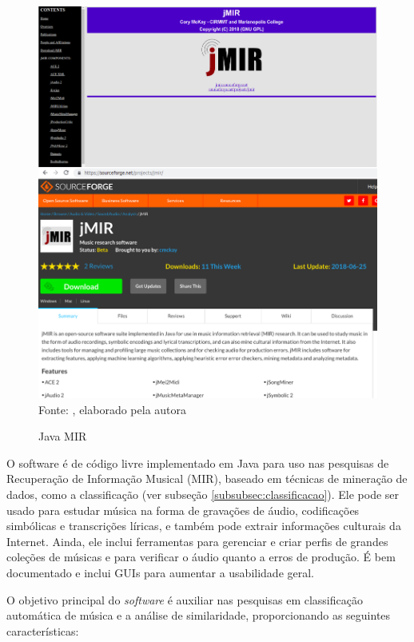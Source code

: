 
\begin{figure}[!htb]
   \centering
   \caption{Java MIR}\label{fig:jmir} 
   \includegraphics[scale=0.25]{figuras/jmir.png}
   \\Fonte: \cite{jmir}, elaborado pela autora
\end{figure}

O software é de código livre implementado em Java para uso nas pesquisas de Recuperação de Informação Musical (MIR), baseado em técnicas de mineração de dados, como a classificação (ver subseção \ref{subsubsec:classificacao}). Ele pode ser usado para estudar música na forma de gravações de áudio, codificações simbólicas e transcrições líricas, e também pode extrair informações culturais da Internet. Ainda, ele inclui ferramentas para gerenciar e criar perfis de grandes coleções de músicas e para verificar o áudio quanto a erros de produção. É bem documentado e inclui GUIs para aumentar a usabilidade geral.

O objetivo principal do \textit{software} é auxiliar nas pesquisas em classificação automática de música e a análise de similaridade, proporcionando as seguintes características:

